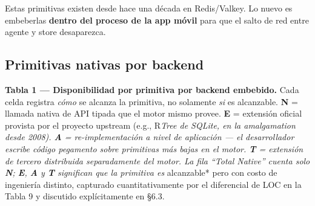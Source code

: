 Estas primitivas existen desde hace una década en Redis/Valkey. Lo nuevo es
embeberlas \textbf{dentro del proceso de la app móvil} para que el salto de red
entre agente y store desaparezca.

\subsection{Primitivas nativas por
backend}\label{primitivas-nativas-por-backend}

\textbf{Tabla 1 --- Disponibilidad por primitiva por backend embebido.} Cada
celda registra \emph{cómo} se alcanza la primitiva, no solamente \emph{si} es
alcanzable. \textbf{N} = llamada nativa de API tipada que el motor mismo provee.
\textbf{E} = extensión oficial provista por el proyecto upstream (e.g.,
R\emph{Tree de SQLite, en la amalgamation desde 2008). \textbf{A} =
re-implementación a nivel de aplicación --- el desarrollador escribe código
pegamento sobre primitivas más bajas en el motor. \textbf{T} = extensión de
tercero distribuida separadamente del motor. La fila ``Total Native'' cuenta
solo \textbf{N}; \textbf{E}, \textbf{A} y \textbf{T} significan que la primitiva
es }alcanzable* pero con costo de ingeniería distinto, capturado
cuantitativamente por el diferencial de LOC en la Tabla 9 y discutido
explícitamente en §6.3.

